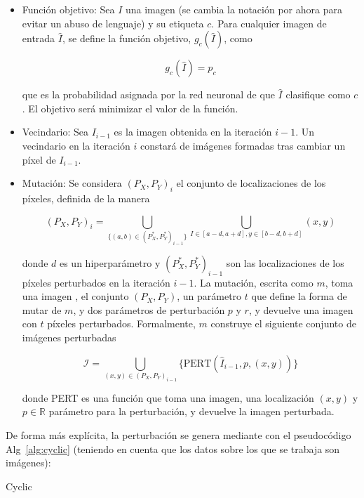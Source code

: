 \begin{itemize}
	\item Función objetivo: Sea $I$ una imagen (se cambia la notación por ahora para evitar un abuso de lenguaje) y su etiqueta $c$. Para cualquier imagen de entrada $\hat{I}$, se define la función objetivo, $g_c(\hat{I})$, como
	
	$$g_c(\hat{I}) = p_c$$
	
	que es la probabilidad asignada por la red neuronal de que $\hat{I}$ clasifique como $c$. El objetivo será minimizar el valor de la función.
	
	\item Vecindario: Sea $I_{i-1}$ es la imagen obtenida en la iteración $i-1$. Un vecindario en la iteración $i$ constará de imágenes formadas tras cambiar un píxel de $I_{i-1}$.
	
	\item Mutación: Se considera $(P_X,P_Y)_i$ el conjunto de localizaciones de los píxeles, definida de la manera
	
	$$(P_X,P_Y)_i = \bigcup_{\{(a,b) \in (P_X^*,P_Y^*)_{i-1}\}} \bigcup_{I \in [a-d,a+d], y \in [b-d,b+d]} (x,y)$$
	
	donde $d$ es un hiperparámetro y $(P_X^*,P_Y^*)_{i-1}$ son las localizaciones de los píxeles perturbados en la iteración $i-1$. La mutación, escrita como $m$, toma una imagen , el conjunto $(P_X,P_Y)$, un parámetro $t$ que define la forma de mutar de $m$, y dos parámetros de perturbación $p$ y $r$, y devuelve una imagen con $t$ píxeles perturbados. Formalmente, $m$ construye el siguiente conjunto de imágenes perturbadas
	
	$$\mathcal{I} = \bigcup_{(x,y) \in (P_X,P_Y)_{i-1}} \{\text{PERT}(\hat{I}_{i-1},p,(x,y))\}$$
	
	donde PERT es una función que toma una imagen, una localización $(x,y)$ y $p \in \mathbb{R}$ parámetro para la perturbación, y devuelve la imagen perturbada.

\end{itemize}

De forma más explícita, la perturbación se genera mediante con el pseudocódigo Alg~\ref{alg:cyclic} (teniendo en cuenta que los datos sobre los que se trabaja son imágenes):

\begin{algorithm}
\caption{Cyclic}\label{alg:cyclic}
\BlankLine
{}
\end{algorithm}

